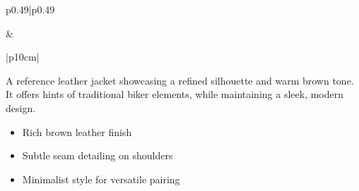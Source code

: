 \documentclass[landscape]{article}
\begin{document}
\begin{tabular}{p{0.49\textwidth}|p{0.49\textwidth}}
\begin{center}
\end{center}
&
\begin{center}
\begin{tabular}{|p{10cm}|}
\hline
{} \\
\hline
\begin{minipage}[t]{\linewidth}
\vspace{0.3cm}
A reference leather jacket showcasing a refined silhouette and warm brown tone. It offers hints of traditional biker elements, while maintaining a sleek, modern design.
\begin{itemize}[leftmargin=*, label={\textcolor{accentgold}{}}]
  \item Rich brown leather finish
  \item Subtle seam detailing on shoulders
  \item Minimalist style for versatile pairing
\end{itemize}
\vspace{0.3cm}
\end{minipage} \\
\hline
\end{tabular}
\end{center}
\end{tabular}

\newpage
\end{document}
